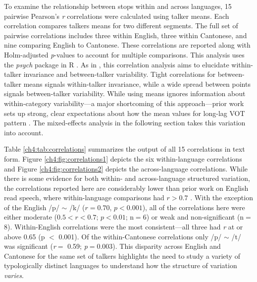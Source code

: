 To examine the relationship between stops within and across languages, 15 pairwise Pearson's \textit{r} correlations were calculated using talker means. Each correlation compares talkers means for two different segments. The full set of pairwise correlations includes three within English, three within Cantonese, and nine comparing English to Cantonese. These correlations are reported along with Holm-adjusted \textit{p}-values to account for multiple comparisons. This analysis uses the \textit{psych} \citep{revelle_2021_psych} package in R \citep{r_2021}. As in \citet{chodroff_2017_structure}, this correlation analysis aims to elucidate within-talker invariance and between-talker variability. Tight correlations for between-talker means signals within-talker invariance, while a wide spread between points signals between-talker variability. While using means ignores information about within-category variability---a major shortcoming of this approach---prior work sets up strong, clear expectations about how the mean values for long-lag VOT pattern \citep{chodroff_2017_structure, cho_1999_vot}. The mixed-effects analysis in the following section takes this variation into account.

Table \ref{ch4:tab:correlations} summarizes the output of all 15 correlations in text form. Figure \ref{ch4:fig:correlations1} depicts the six within-language correlations and Figure \ref{ch4:fig:correlations2} depicts the across-language correlations. While there is some evidence for both within- and across-language structured variation, the correlations reported here are considerably lower than prior work on English read speech, where within-language comparisons had $r>0.7$ \citep{chodroff_2017_structure, chodroff_2019_l2}. With the exception of the English /p/ $\sim$ /k/ ($r=0.70$, $p<0.001$), all of the correlations here were either moderate ($0.5<r<0.7$; $p<0.01$; n$=$6) or weak and non-significant (n$=$8). Within-English correlations were the most consistent---all three had \textit{r} at or above 0.65 (p $<$ 0.001). Of the within-Cantonese correlations only /p/ $\sim$ /t/ was significant (\textit{r}$=$ 0.59; \textit{p}$=$0.003). This disparity across English and Cantonese for the same set of talkers highlights the need to study a variety of typologically distinct languages to understand how the structure of variation \textit{varies}.

